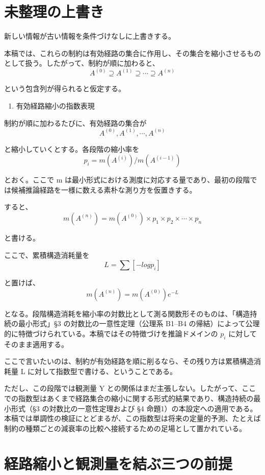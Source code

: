 \documentclass[12pt,a4paper]{article}
\begin{document}
\section{未整理の上書き}\label{ux672aux6574ux7406ux306eux4e0aux66f8ux304d}

新しい情報が古い情報を条件づけなしに上書きする。

本稿では、これらの制約は有効経路の集合に作用し、その集合を縮小させるものとして扱う。したがって、制約が順に加わると、 \[
A^{(0)} \supseteq A^{(1)} \supseteq \cdots \supseteq A^{(n)}
\]

という包含列が得られると仮定する。

\begin{enumerate}
\def\labelenumi{\arabic{enumi}.}
\setcounter{enumi}{4}
\tightlist
\item
  有効経路縮小の指数表現
\end{enumerate}

制約が順に加わるたびに、有効経路の集合が \[
A^{(0)}, A^{(1)}, \cdots, A^{(n)}
\]

と縮小していくとする。各段階の縮小率を \[
p_{i} = m(A^{(i)}) / m(A^{(i-1)})
\]

とおく。ここで m は最小形式における測度に対応する量であり、最初の段階では候補推論経路を一様に数える素朴な測り方を仮置きする。

すると、 \[
m(A^{(n)}) = m(A^{(0)}) \times p_1 \times p_2 \times \cdots \times p_{n}
\]

と書ける。

ここで、累積構造消耗量を \[
L = \sum[-log p_{i}]
\]

と置けば、 \[
m(A^{(n)}) = m(A^{(0)}) e^{-L}
\]

となる。段階構造消耗を縮小率の対数比として測る関数形そのものは、「構造持続の最小形式」§3 の対数比の一意性定理（公理系 B1--B4 の帰結）によって公理的に特徴づけられている。本稿ではその特徴づけを推論ドメインの \(p_{i}\) に対してそのまま適用する。

ここで言いたいのは、制約が有効経路を順に削るなら、その残り方は累積構造消耗量 L に対して指数型で書ける、ということである。

ただし、この段階では観測量 Y との関係はまだ主張しない。したがって、ここでの指数型はあくまで経路集合の縮小に関する形式的結果であり、構造持続の最小形式（§3 の対数比の一意性定理および §4 命題1）の本設定への適用である。本稿では単調性の検証にとどまるが、この指数型は将来の定量的予測、たとえば制約の種類ごとの減衰率の比較へ接続するための足場として置かれている。

\section{経路縮小と観測量を結ぶ三つの前提}\label{ux7d4cux8defux7e2eux5c0fux3068ux89b3ux6e2cux91cfux3092ux7d50ux3076ux4e09ux3064ux306eux524dux63d0}
\end{document}
